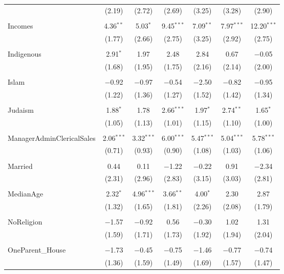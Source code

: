 \documentclass[openany]{book}
\begin{document}
\begin{table}[!htbp]
\begin{tabular}{@{\extracolsep{1pt}}lcccccc}
  & (2.19) & (2.72) & (2.69) & (3.25) & (3.28) & (2.90) \\ 
  & & & & & & \\ 
 Incomes & 4.36$^{**}$ & 5.03$^{*}$ & 9.45$^{***}$ & 7.09$^{**}$ & 7.97$^{***}$ & 12.20$^{***}$ \\ 
  & (1.77) & (2.66) & (2.75) & (3.25) & (2.92) & (2.75) \\ 
  & & & & & & \\ 
 Indigenous & 2.91$^{*}$ & 1.97 & 2.48 & 2.84 & 0.67 & $-$0.05 \\ 
  & (1.68) & (1.95) & (1.75) & (2.16) & (2.14) & (2.00) \\ 
  & & & & & & \\ 
 Islam & $-$0.92 & $-$0.97 & $-$0.54 & $-$2.50 & $-$0.82 & $-$0.95 \\ 
  & (1.22) & (1.36) & (1.27) & (1.52) & (1.42) & (1.34) \\ 
  & & & & & & \\ 
 Judaism & 1.88$^{*}$ & 1.78 & 2.66$^{***}$ & 1.97$^{*}$ & 2.74$^{**}$ & 1.65$^{*}$ \\ 
  & (1.05) & (1.13) & (1.01) & (1.15) & (1.10) & (1.00) \\ 
  & & & & & & \\ 
 ManagerAdminClericalSales & 2.06$^{***}$ & 3.32$^{***}$ & 6.00$^{***}$ & 5.47$^{***}$ & 5.04$^{***}$ & 5.78$^{***}$ \\ 
  & (0.71) & (0.93) & (0.90) & (1.08) & (1.03) & (1.06) \\ 
  & & & & & & \\ 
 Married & 0.44 & 0.11 & $-$1.22 & $-$0.22 & 0.91 & $-$2.34 \\ 
  & (2.31) & (2.96) & (2.83) & (3.15) & (3.03) & (2.81) \\ 
  & & & & & & \\ 
 MedianAge & 2.32$^{*}$ & 4.96$^{***}$ & 3.66$^{**}$ & 4.00$^{*}$ & 2.30 & 2.87 \\ 
  & (1.32) & (1.65) & (1.81) & (2.26) & (2.08) & (1.79) \\ 
  & & & & & & \\ 
 NoReligion & $-$1.57 & $-$0.92 & 0.56 & $-$0.30 & 1.02 & 1.31 \\ 
  & (1.59) & (1.71) & (1.73) & (1.92) & (1.94) & (2.04) \\ 
  & & & & & & \\ 
 OneParent\_House & $-$1.73 & $-$0.45 & $-$0.75 & $-$1.46 & $-$0.77 & $-$0.74 \\ 
  & (1.36) & (1.59) & (1.49) & (1.69) & (1.57) & (1.47) \\ 

\end{tabular}
\end{table}
\end{document}
